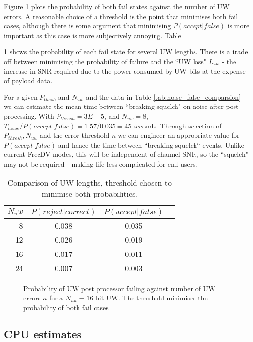 \documentclass{article}
\begin{document}
Figure \ref{fig:acq_uw} plots the probability of both fail states against the number of UW errors.  A reasonable choice of a threshold is the point that minimises both fail cases, although there is some argument that minimising $P(accept|false)$ is more important as this case is more subjectively annoying.  Table {\ref{tab:acq_uw} shows the probability of each fail state for several UW lengths.  There is a trade off between minimising the probability of failure and the ``UW loss" $L_{uw}$ - the increase in SNR required due to the power consumed by UW bits at the expense of payload data. 

For a given $P_{thesh}$ and $N_{uw}$ and the data in Table \ref{tab:noise_false_comparsion} we can estimate the mean time between ``breaking squelch" on noise after post processing. With $P_{thresh}=3E-5$, and $N_{uw}=8$, $T_{noise}/P(accept|false)=1.57/0.035=45$ seconds.  Through selection of $P_{thresh}, N_{uw}$ and the error threshold $n$ we can engineer an appropriate value for $P(accept|false)$ and hence the time between ``breaking squelch`` events.  Unlike current FreeDV modes, this will be independent of channel SNR, so the ``squelch" may not be required - making life less complicated for end users.

\begin{table}[h]
\centering
\begin{tabular}{r c c c}
 \hline
 $N_uw$ & $P(reject|correct)$ & $P(accept|false)$ \\ 
 \hline
 8  & 0.038 & 0.035 \\
 12 & 0.026 & 0.019 \\
 16 & 0.017 & 0.011 \\
 24 & 0.007 & 0.003 \\
 \hline
\end{tabular}
\caption{Comparison of UW lengths, threshold chosen to minimise both probabilities.}
\label{tab:acq_uw}
\end{table}

\begin{figure}[H]
\caption{Probability of UW post processor failing against number of UW errors $n$ for a $N_{uw}=16$ bit UW.  The threshold minimises the probability of both fail cases}
\label{fig:acq_uw}
\begin{center}

\end{center}
\end{figure}

\subsection{CPU estimates}

}
\end{document}
